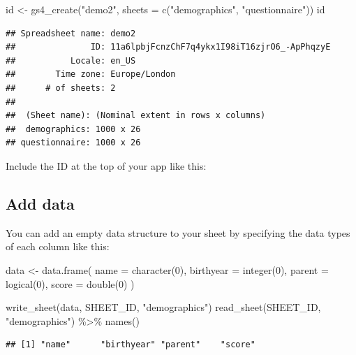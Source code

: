 \documentclass[
]{book}
\newenvironment{Shaded}{\begin{snugshade}}{\end{snugshade}}
\newcommand{\AttributeTok}[1]{\textcolor[rgb]{0.77,0.63,0.00}{#1}}
\newcommand{\DecValTok}[1]{\textcolor[rgb]{0.00,0.00,0.81}{#1}}
\newcommand{\FunctionTok}[1]{\textcolor[rgb]{0.00,0.00,0.00}{#1}}
\newcommand{\NormalTok}[1]{#1}
\newcommand{\OtherTok}[1]{\textcolor[rgb]{0.56,0.35,0.01}{#1}}
\newcommand{\SpecialCharTok}[1]{\textcolor[rgb]{0.00,0.00,0.00}{#1}}
\newcommand{\StringTok}[1]{\textcolor[rgb]{0.31,0.60,0.02}{#1}}
\begin{document}
\begin{Shaded}
\begin{Highlighting}[]
\NormalTok{id }\OtherTok{\textless{}{-}} \FunctionTok{gs4\_create}\NormalTok{(}\StringTok{"demo2"}\NormalTok{, }\AttributeTok{sheets =} \FunctionTok{c}\NormalTok{(}\StringTok{"demographics"}\NormalTok{, }\StringTok{"questionnaire"}\NormalTok{))}
\NormalTok{id}
\end{Highlighting}
\end{Shaded}

\begin{verbatim}
## Spreadsheet name: demo2
##               ID: 11a6lpbjFcnzChF7q4ykx1I98iT16zjrO6_-ApPhqzyE
##           Locale: en_US
##        Time zone: Europe/London
##      # of sheets: 2
## 
##  (Sheet name): (Nominal extent in rows x columns)
##  demographics: 1000 x 26
## questionnaire: 1000 x 26
\end{verbatim}

Include the ID at the top of your app like this:

\hypertarget{add-data}{%
\subsection{Add data}\label{add-data}}

You can add an empty data structure to your sheet by specifying the data types of each column like this:

\begin{Shaded}
\begin{Highlighting}[]
\NormalTok{data }\OtherTok{\textless{}{-}} \FunctionTok{data.frame}\NormalTok{(}
  \AttributeTok{name =} \FunctionTok{character}\NormalTok{(}\DecValTok{0}\NormalTok{),}
  \AttributeTok{birthyear =} \FunctionTok{integer}\NormalTok{(}\DecValTok{0}\NormalTok{),}
  \AttributeTok{parent =} \FunctionTok{logical}\NormalTok{(}\DecValTok{0}\NormalTok{),}
  \AttributeTok{score =} \FunctionTok{double}\NormalTok{(}\DecValTok{0}\NormalTok{)}
\NormalTok{)}

\FunctionTok{write\_sheet}\NormalTok{(data, SHEET\_ID, }\StringTok{"demographics"}\NormalTok{)}
\FunctionTok{read\_sheet}\NormalTok{(SHEET\_ID, }\StringTok{"demographics"}\NormalTok{) }\SpecialCharTok{\%\textgreater{}\%} \FunctionTok{names}\NormalTok{()}
\end{Highlighting}
\end{Shaded}

\begin{verbatim}
## [1] "name"      "birthyear" "parent"    "score"
\end{verbatim}
\end{document}
